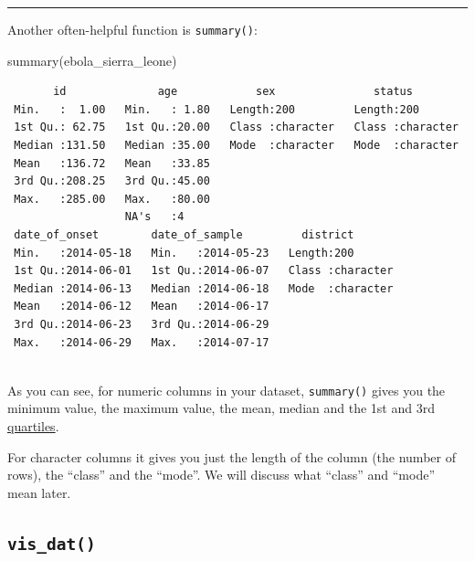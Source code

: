 \documentclass[
  letterpaper,
  DIV=11,
  numbers=noendperiod]{scrreprt}
\newenvironment{Shaded}{\begin{snugshade}}{\end{snugshade}}
\newcommand{\FunctionTok}[1]{\textcolor[rgb]{0.28,0.35,0.67}{#1}}
\newcommand{\NormalTok}[1]{\textcolor[rgb]{0.00,0.23,0.31}{#1}}
\begin{document}
\begin{center}\rule{0.5\linewidth}{0.5pt}\end{center}

Another often-helpful function is \texttt{summary()}:

\begin{Shaded}
\begin{Highlighting}[]
\FunctionTok{summary}\NormalTok{(ebola\_sierra\_leone)}
\end{Highlighting}
\end{Shaded}

\begin{verbatim}
       id              age            sex               status         
 Min.   :  1.00   Min.   : 1.80   Length:200         Length:200        
 1st Qu.: 62.75   1st Qu.:20.00   Class :character   Class :character  
 Median :131.50   Median :35.00   Mode  :character   Mode  :character  
 Mean   :136.72   Mean   :33.85                                        
 3rd Qu.:208.25   3rd Qu.:45.00                                        
 Max.   :285.00   Max.   :80.00                                        
                  NA's   :4                                            
 date_of_onset        date_of_sample         district        
 Min.   :2014-05-18   Min.   :2014-05-23   Length:200        
 1st Qu.:2014-06-01   1st Qu.:2014-06-07   Class :character  
 Median :2014-06-13   Median :2014-06-18   Mode  :character  
 Mean   :2014-06-12   Mean   :2014-06-17                     
 3rd Qu.:2014-06-23   3rd Qu.:2014-06-29                     
 Max.   :2014-06-29   Max.   :2014-07-17                     
                                                             
\end{verbatim}

As you can see, for numeric columns in your dataset, \texttt{summary()}
gives you the minimum value, the maximum value, the mean, median and the
1st and 3rd
\href{https://www.mathsisfun.com/data/quartiles.html}{quartiles}.

For character columns it gives you just the length of the column (the
number of rows), the ``class'' and the ``mode''. We will discuss what
``class'' and ``mode'' mean later.

\subsection{\texorpdfstring{\texttt{vis\_dat()}}{vis\_dat()}}\label{vis_dat}
\end{document}
